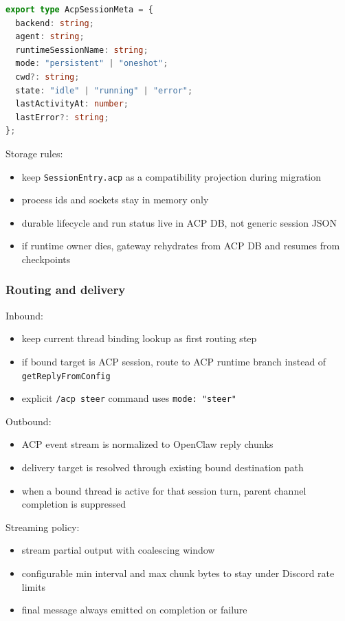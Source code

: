 \begin{lstlisting}[language=typescript]
export type AcpSessionMeta = {
  backend: string;
  agent: string;
  runtimeSessionName: string;
  mode: "persistent" | "oneshot";
  cwd?: string;
  state: "idle" | "running" | "error";
  lastActivityAt: number;
  lastError?: string;
};
\end{lstlisting}


Storage rules:

\begin{itemize}
  \item keep \texttt{SessionEntry.acp} as a compatibility projection during migration
  \item process ids and sockets stay in memory only
  \item durable lifecycle and run status live in ACP DB, not generic session JSON
  \item if runtime owner dies, gateway rehydrates from ACP DB and resumes from checkpoints
\end{itemize}


\subsubsection{Routing and delivery}


Inbound:

\begin{itemize}
  \item keep current thread binding lookup as first routing step
  \item if bound target is ACP session, route to ACP runtime branch instead of \texttt{getReplyFromConfig}
  \item explicit \texttt{/acp steer} command uses \texttt{mode: "steer"}
\end{itemize}


Outbound:

\begin{itemize}
  \item ACP event stream is normalized to OpenClaw reply chunks
  \item delivery target is resolved through existing bound destination path
  \item when a bound thread is active for that session turn, parent channel completion is suppressed
\end{itemize}


Streaming policy:

\begin{itemize}
  \item stream partial output with coalescing window
  \item configurable min interval and max chunk bytes to stay under Discord rate limits
  \item final message always emitted on completion or failure
\end{itemize}


